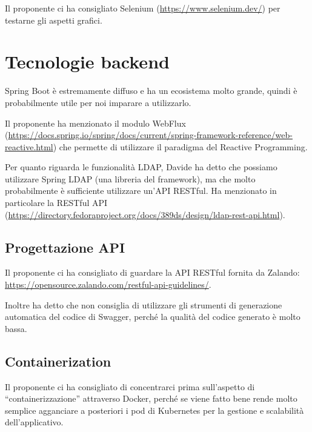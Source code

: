 \documentclass{article}
\begin{document}
Il proponente ci ha consigliato Selenium (\href{https://www.selenium.dev/}{https://www.selenium.dev/}) per testarne gli aspetti grafici.


\section{Tecnologie backend}%
\label{sec:tecnologie_lato_server}

Spring Boot è estremamente diffuso e ha un ecosistema molto grande, quindi è probabilmente utile per noi imparare a utilizzarlo.

Il proponente ha menzionato il modulo WebFlux (\href{https://docs.spring.io/spring/docs/current/spring-framework-reference/web-reactive.html}{https://docs.spring.io/spring/docs/current/spring-framework-reference/web-reactive.html}) che permette di utilizzare il paradigma del Reactive Programming.

Per quanto riguarda le funzionalità LDAP, Davide ha detto che possiamo utilizzare Spring LDAP (una libreria del framework), ma che molto probabilmente è sufficiente utilizzare un'API RESTful.
Ha menzionato in particolare la RESTful API (\href{https://directory.fedoraproject.org/docs/389ds/design/ldap-rest-api.html}{https://directory.fedoraproject.org/docs/389ds/design/ldap-rest-api.html}).

\subsection{Progettazione API}%
\label{sub:progettazione_api}

Il proponente ci ha consigliato di guardare la API RESTful fornita da Zalando: \href{https://opensource.zalando.com/restful-api-guidelines/}{https://opensource.zalando.com/restful-api-guidelines/}.

Inoltre ha detto che non consiglia di utilizzare gli strumenti di generazione automatica del codice di Swagger, perché la qualità del codice generato è molto bassa.

\subsection{Containerization}%
\label{sub:containerization}

Il proponente ci ha consigliato di concentrarci prima sull'aspetto di ``containerizzazione'' attraverso Docker, perché se viene fatto bene rende molto semplice agganciare a posteriori i pod di Kubernetes per la gestione e scalabilità dell'applicativo.
\end{document}
